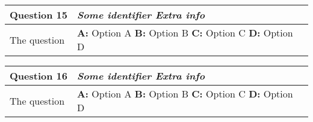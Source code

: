 \begin{tabular}{p{6cm}p{12.5cm}|} 
\textbf{Question 15} & \emph{Some identifier \hfill Extra info}  \\ \toprule  
The question & 
\textbf{A:} Option A \newline 
\textbf{B:} Option B \newline  
\textbf{C:} Option C \newline  
\textbf{D:} Option D \\ \bottomrule 
\end{tabular}


\begin{tabular}{p{6cm}p{12.5cm}|} 
\textbf{Question 16} & \emph{Some identifier \hfill Extra info}  \\ \toprule  
The question & 
\textbf{A:} Option A \newline 
\textbf{B:} Option B \newline  
\textbf{C:} Option C \newline  
\textbf{D:} Option D \\ \bottomrule 
\end{tabular}


